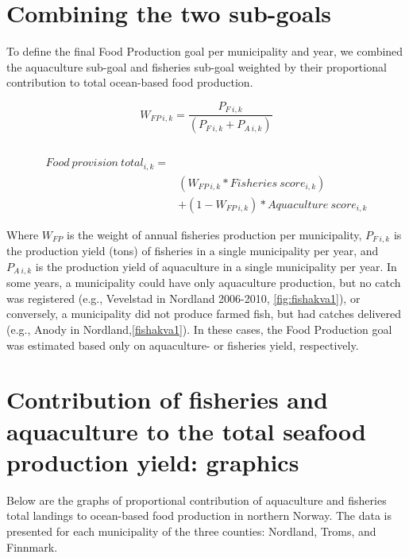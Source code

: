 \documentclass[
]{book}
\begin{document}
\hypertarget{combining-the-two-sub-goals}{%
\section{Combining the two sub-goals}\label{combining-the-two-sub-goals}}

To define the final Food Production goal per municipality and year, we combined the aquaculture sub-goal and fisheries sub-goal weighted by their proportional contribution to total ocean-based food production.

\begin{equation}
W_{FP\ i, k} = \frac{P_{F\ i,k}}{(P_{F\ i,k} + P_{A\ i,k})}
\label{eq:foodprod} 
\end{equation}

\[~\]
\[~\]

\begin{equation}
\begin{split}
  Food\ provision\ total_{i,k}  = \\
  & (W_{FP\ i,k} * Fisheries\ score_{i,k})\\
  & + (1 - W_{FP\ i,k}) *Aquaculture\ score_{i,k}  
\end{split}  
  \label{eq:foodprod}  
\end{equation}
\[~\]

Where \(W_{FP}\) is the weight of annual fisheries production per municipality, \(P_{F\ i,k}\) is the production yield (tons) of fisheries in a single municipality per year, and \(P_{A\ i,k}\) is the production yield of aquaculture in a single municipality per year.
In some years, a municipality could have only aquaculture production, but no catch was registered (e.g., Vevelstad in Nordland 2006-2010, \ref{fig:fishakva1}), or conversely, a municipality did not produce farmed fish, but had catches delivered (e.g., Anody in Nordland,\ref{fishakva1}). In these cases, the Food Production goal was estimated based only on aquaculture- or fisheries yield, respectively.

\hypertarget{contribution-of-fisheries-and-aquaculture-to-the-total-seafood-production-yield-graphics}{%
\section{Contribution of fisheries and aquaculture to the total seafood production yield: graphics}\label{contribution-of-fisheries-and-aquaculture-to-the-total-seafood-production-yield-graphics}}

Below are the graphs of proportional contribution of aquaculture and fisheries total landings to ocean-based food production in northern Norway. The data is presented for each municipality of the three counties: Nordland, Troms, and Finnmark.
\end{document}
